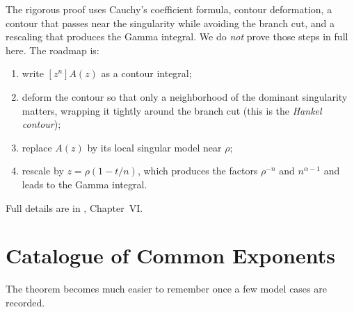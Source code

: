\begin{remark}
The rigorous proof uses Cauchy's coefficient formula, contour deformation, a contour that passes near the singularity while avoiding the branch cut, and a rescaling that produces the Gamma integral. We do \emph{not} prove those steps in full here. The roadmap is:
\begin{enumerate}
  \item write $[z^n]A(z)$ as a contour integral;
  \item deform the contour so that only a neighborhood of the dominant singularity matters, wrapping it tightly around the branch cut (this is the \emph{Hankel contour});
  \item replace $A(z)$ by its local singular model near $\rho$;
  \item rescale by $z = \rho(1-t/n)$, which produces the factors $\rho^{-n}$ and $n^{\alpha-1}$ and leads to the Gamma integral.
\end{enumerate}

\begin{center}
\end{center}

Full details are in \cite{FlajoletSedgewick2009}, Chapter~VI.
\end{remark}

\section{Catalogue of Common Exponents}

The theorem becomes much easier to remember once a few model cases are recorded.

